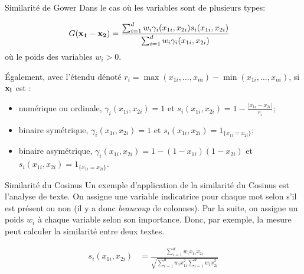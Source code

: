 \documentclass[10pt, french]{article}
\begin{document}
\begin{multicols*}{3}
\begin{conceptgen}{Similarité de Gower}
Dans le cas où les variables sont de plusieurs types:
\setlength{\mathindent}{-1cm}

\begin{align*}
	G(\mathbf{x_{1} - x_{2}})
	&=	\frac{\sum_{i = 1}^{d} w_{i} \gamma_{i} (x_{1i}, x_{2i}) s_{i}(x_{1i}, x_{2i})}{\sum_{i = 1}^{d} w_{i} \gamma_{i} (x_{1i}, x_{2i})}
\end{align*}
\setlength{\mathindent}{1cm}
où le poids des variables $w_{i} > 0$.

Également, avec l'étendu dénoté $r_{i} = \max(x_{1i}, \dots, x_{ni}) - \min(x_{1i}, \dots, x_{ni})$, si $\mathbf{x_{i}}$ est :

\begin{itemize}[leftmargin = *]
	\item	numérique ou ordinale, $\gamma_{i} (x_{1i}, x_{2i}) = 1$ et  $s_{i}(x_{1i}, x_{2i}) = 1 - \frac{|x_{1i} - x_{2i}|}{r_{i}}$;
	\item	binaire symétrique, $\gamma_{i} (x_{1i}, x_{2i}) = 1$ et  $s_{i}(x_{1i}, x_{2i}) = 1_{\{x_{1i} = x_{2i}\}}$;
	\item	binaire asymétrique, $\gamma_{i} (x_{1i}, x_{2i}) = 1 - (1 - x_{1i})(1 - x_{2i})$ et  $s_{i}(x_{1i}, x_{2i}) = 1_{\{x_{1i} = x_{2i}\}}$.
\end{itemize}
\end{conceptgen}

\begin{conceptgen}{Similarité du Cosinus}
Un exemple d'application de la similarité du Cosinus est l'analyse de texte. On assigne une variable indicatrice pour chaque mot selon s'il est présent ou non (il y a donc \textit{beaucoup} de colonnes). Par la suite, on assigne un poids $w_i$ à chaque variable selon son importance. Donc, par exemple, la mesure peut calculer la similarité entre deux textes.

\begin{align*}
	s_{i}(x_{1i}, x_{2i}) 
	&=	\frac{\sum_{i = 1}^{d} w_{i} x_{1i} x_{2i}}{\sqrt{\sum_{i = 1}^{d}w_{i}x_{1i}^{2}\sum_{i = 1}^{d} w_{i} x_{2i}^{2}}}
\end{align*}
\end{conceptgen}


\end{multicols*}
\end{document}
